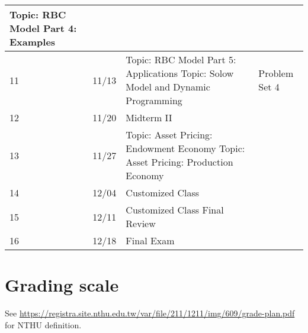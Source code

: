 \documentclass[12pt]{article}
\begin{document}
\begin{tabular}{|p{\bb}|p{\bb}|p{\pp}|p{\rr}|}
        \newline
        Topic: RBC Model Part 4: Examples
        &
    \\
    \hline
        11
        &
        11/13
        &
        Topic: RBC Model Part 5: Applications
        \newline
        Topic: Solow Model and Dynamic Programming
        &
        Problem Set 4
    \\
    \hline
        12
        &
        11/20
        &
        Midterm II
        &
    \\
    \hline
        13
        &
        11/27
        &
        Topic: Asset Pricing: Endowment Economy
        \newline
        Topic: Asset Pricing: Production Economy
        &
    \\
    \hline
        14
        &
        12/04
        &
        Customized Class
        &
    \\
    \hline
        15
        &
        12/11
        &
        Customized Class
        \newline
        Final Review
        &
    \\
    \hline
        16
        &
        12/18
        &
        Final Exam
        &
    \\
    \hline
\end{tabular}

\section*{Grading scale}

See \url{https://registra.site.nthu.edu.tw/var/file/211/1211/img/609/grade-plan.pdf} for NTHU definition.
\end{document}
